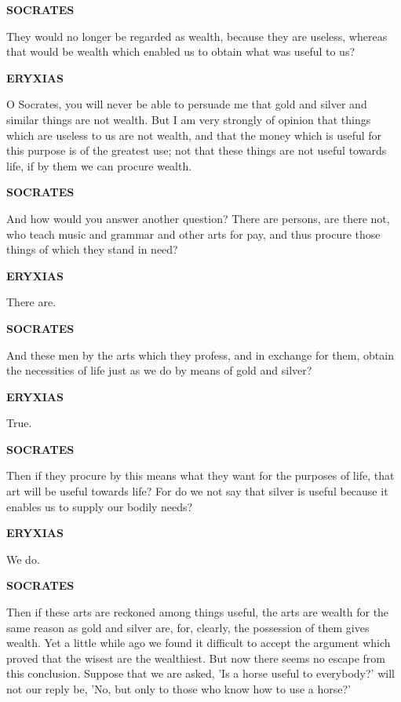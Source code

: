 \documentclass[11pt,letter]{article}
\begin{document}
\par \textbf{SOCRATES}
\par   They would no longer be regarded as wealth, because they are useless, whereas that would be wealth which enabled us to obtain what was useful to us?

\par \textbf{ERYXIAS}
\par   O Socrates, you will never be able to persuade me that gold and silver and similar things are not wealth. But I am very strongly of opinion that things which are useless to us are not wealth, and that the money which is useful for this purpose is of the greatest use; not that these things are not useful towards life, if by them we can procure wealth.

\par \textbf{SOCRATES}
\par   And how would you answer another question? There are persons, are there not, who teach music and grammar and other arts for pay, and thus procure those things of which they stand in need?

\par \textbf{ERYXIAS}
\par   There are.

\par \textbf{SOCRATES}
\par   And these men by the arts which they profess, and in exchange for them, obtain the necessities of life just as we do by means of gold and silver?

\par \textbf{ERYXIAS}
\par   True.

\par \textbf{SOCRATES}
\par   Then if they procure by this means what they want for the purposes of life, that art will be useful towards life? For do we not say that silver is useful because it enables us to supply our bodily needs?

\par \textbf{ERYXIAS}
\par   We do.

\par \textbf{SOCRATES}
\par   Then if these arts are reckoned among things useful, the arts are wealth for the same reason as gold and silver are, for, clearly, the possession of them gives wealth. Yet a little while ago we found it difficult to accept the argument which proved that the wisest are the wealthiest. But now there seems no escape from this conclusion. Suppose that we are asked, 'Is a horse useful to everybody?' will not our reply be, 'No, but only to those who know how to use a horse?'
\end{document}
